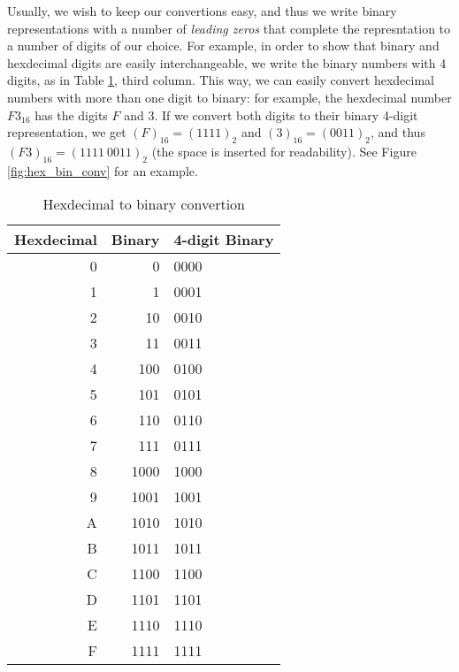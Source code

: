 Usually, we wish to keep our convertions easy, and thus we write binary representations with a number of \textit{leading zeros} that complete the represntation to a number of digits of our choice. For example, in order to show that binary and hexdecimal digits are easily interchangeable, we write the binary numbers with 4 digits, as in Table \ref{tab:bin_hex}, third column. This way, we can easily convert hexdecimal numbers with more than one digit to binary: for example, the hexdecimal number $F3_{16}$ has the digits $F$ and $3$. If we convert both digits to their binary 4-digit representation, we get $\left( F \right)_{16}=\left( 1111 \right)_{2}$ and $\left( 3 \right)_{16}=\left( 0011 \right)_{2}$, and thus $\left(F3\right)_{16}=\left(1111\ 0011\right)_{2}$ (the space is inserted for readability). See Figure \ref{fig:hex_bin_conv} for an example.

\begin{table}
  \centering
  \caption{Hexdecimal to binary convertion}
  \label{tab:bin_hex}
  \setlength{\extrarowheight}{10pt}
  \begin{tabular}[]{ r r l }
    Hexdecimal & Binary & 4-digit Binary \\
    \hline
    0 & 0 & 0000 \\
    1 & 1 & 0001 \\
    2 & 10 & 0010 \\
    3 & 11 & 0011 \\
    4 & 100 & 0100 \\
    5 & 101 & 0101 \\
    6 & 110 & 0110 \\
    7 & 111 & 0111 \\
    8 & 1000 & 1000 \\
    9 & 1001 & 1001 \\
    A & 1010 & 1010 \\
    B & 1011 & 1011 \\
    C & 1100 & 1100 \\
    D & 1101 & 1101 \\
    E & 1110 & 1110 \\
    F & 1111 & 1111 \\
    \hline
  \end{tabular}\end{table}

